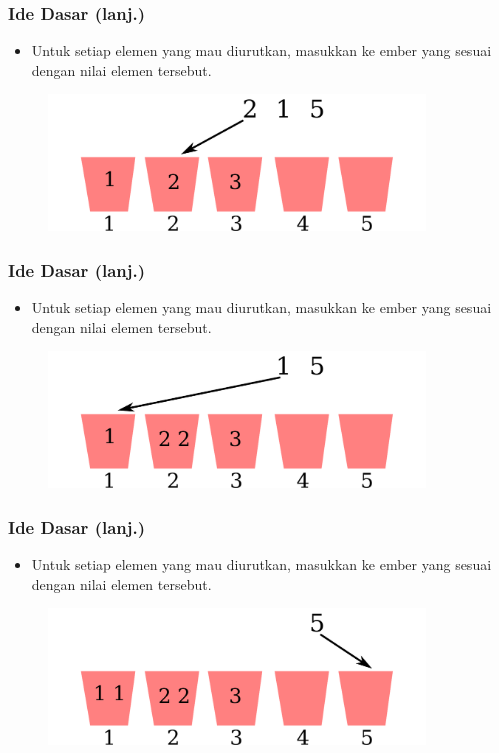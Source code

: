 \begin{frame}
\frametitle{Ide Dasar (lanj.)}
  \begin{itemize}
    \item Untuk setiap elemen yang mau diurutkan, masukkan ke ember yang
    sesuai dengan nilai elemen tersebut.
  \end{itemize}
  \begin{figure}
    \includegraphics[width=10cm]{asset/counting-sort-5.pdf}
  \end{figure}
\end{frame}

\begin{frame}
\frametitle{Ide Dasar (lanj.)}
  \begin{itemize}
    \item Untuk setiap elemen yang mau diurutkan, masukkan ke ember yang
    sesuai dengan nilai elemen tersebut.
  \end{itemize}
  \begin{figure}
    \includegraphics[width=10cm]{asset/counting-sort-6.pdf}
  \end{figure}
\end{frame}

\begin{frame}
\frametitle{Ide Dasar (lanj.)}
  \begin{itemize}
    \item Untuk setiap elemen yang mau diurutkan, masukkan ke ember yang
    sesuai dengan nilai elemen tersebut.
  \end{itemize}
  \begin{figure}
    \includegraphics[width=10cm]{asset/counting-sort-7.pdf}
  \end{figure}
\end{frame}

